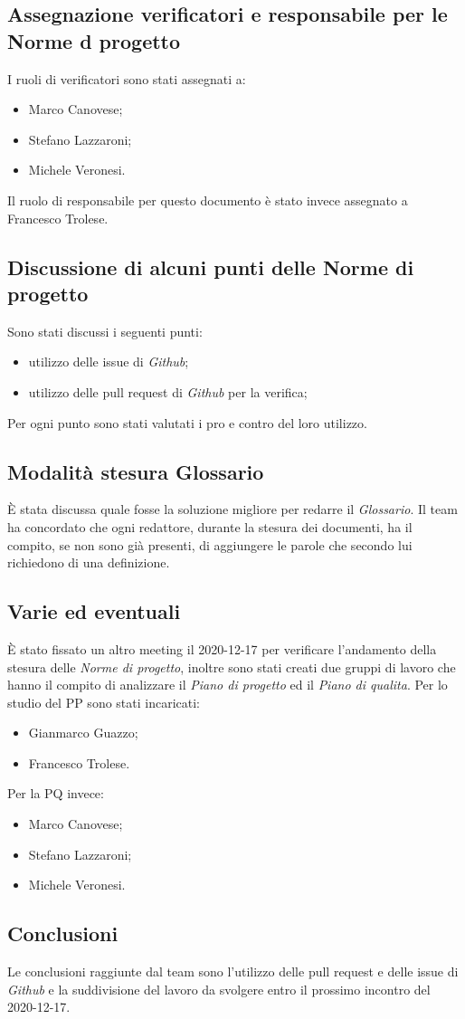 	\subsection{Assegnazione verificatori e responsabile per le Norme d progetto}
	I ruoli di verificatori sono stati assegnati a:
	\begin{itemize}
		\item Marco Canovese;
		\item Stefano Lazzaroni;
		\item Michele Veronesi.
	\end{itemize}
	Il ruolo di responsabile per questo documento è stato invece assegnato a Francesco Trolese.

	\subsection{Discussione di alcuni punti delle Norme di progetto}
	Sono stati discussi i seguenti punti:
	\begin{itemize}
		\item utilizzo delle issue di \textit{Github};
		\item utilizzo delle pull request di \textit{Github} per la verifica;
	\end{itemize}
	Per ogni punto sono stati valutati i pro e contro del loro utilizzo.

	\subsection{Modalità stesura Glossario}
	È stata discussa quale fosse la soluzione migliore per redarre il \textit{Glossario}. Il team ha concordato che ogni redattore, durante la stesura dei documenti, ha il compito, se non sono già presenti, di aggiungere le parole che secondo lui richiedono di una definizione.
	
	\subsection{Varie ed eventuali}
	È stato fissato un altro meeting il 2020-12-17 per verificare l'andamento della stesura delle \textit{Norme di progetto}, inoltre sono stati creati due gruppi di lavoro che hanno il compito di analizzare il \textit{Piano di progetto} ed il \textit{Piano di qualita}.
	Per lo studio del PP sono stati incaricati:
	\begin{itemize}
		\item Gianmarco Guazzo;
		\item Francesco Trolese.
	\end{itemize}
	Per la PQ invece:
	\begin{itemize}
		\item Marco Canovese;
		\item Stefano Lazzaroni;
		\item Michele Veronesi.
	\end{itemize}
	

	\subsection{Conclusioni}
	Le conclusioni raggiunte dal team sono l'utilizzo delle pull request e delle issue di \textit{Github} e la suddivisione del lavoro da svolgere entro il prossimo incontro del 2020-12-17.

	